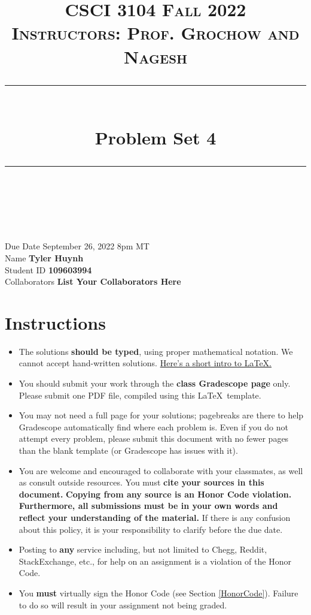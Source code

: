 \documentclass[11pt]{article}
\title{
\normalfont \normalsize 
\textsc{CSCI 3104 Fall 2022 \\ 
Instructors: Prof. Grochow and Nagesh} \\
[10pt] 
\rule{\linewidth}{0.5pt} \\[6pt] 
\huge Problem Set 4 \\
\rule{\linewidth}{2pt}  \\[10pt]
}
\date{}
\theoremstyle{definition}
\theoremstyle{definition}
\theoremstyle{definition}
\begin{document}

\maketitle


\noindent
Due Date \dotfill September 26, 2022 8pm MT\\
Name \dotfill \textbf{Tyler Huynh} \\
Student ID \dotfill \textbf{109603994} \\
Collaborators \dotfill \textbf{List Your Collaborators Here}

\tableofcontents

\section*{Instructions}
 \begin{itemize}
	\item The solutions \textbf{should be typed}, using proper mathematical notation. We cannot accept hand-written solutions. \href{http://ece.uprm.edu/~caceros/latex/introduction.pdf}{Here's a short intro to \LaTeX.}
	\item You should submit your work through the \textbf{class Gradescope page} only. Please submit one PDF file, compiled using this \LaTeX \ template.
	\item You may not need a full page for your solutions; pagebreaks are there to help Gradescope automatically find where each problem is. Even if you do not attempt every problem, please submit this document with no fewer pages than the blank template (or Gradescope has issues with it).

	\item You are welcome and encouraged to collaborate with your classmates, as well as consult outside resources. You must \textbf{cite your sources in this document.} \textbf{Copying from any source is an Honor Code violation. Furthermore, all submissions must be in your own words and reflect your understanding of the material.} If there is any confusion about this policy, it is your responsibility to clarify before the due date. 

	\item Posting to \textbf{any} service including, but not limited to Chegg, Reddit, StackExchange, etc., for help on an assignment is a violation of the Honor Code.

	\item You \textbf{must} virtually sign the Honor Code (see Section \ref{HonorCode}). Failure to do so will result in your assignment not being graded.
\end{itemize}
\end{document}
